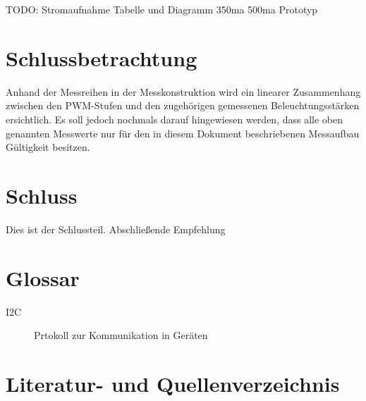 \documentclass[a4paper,12pt]{scrartcl}
\begin{document}

TODO: Stromaufnahme Tabelle und Diagramm 350ma 500ma Prototyp

\clearpage
\section{Schlussbetrachtung}
Anhand der Messreihen in der Messkonstruktion wird ein linearer Zusammenhang zwischen den PWM-Stufen und den zugehörigen gemessenen Beleuchtungsstärken
ersichtlich. Es soll jedoch nochmals darauf hingewiesen werden, dass alle oben genannten Messwerte nur für den in diesem Dokument beschriebenen Messaufbau
Gültigkeit besitzen.


\clearpage
\section{Schluss}
Dies ist der Schlussteil. Abschlie\ss{}ende Empfehlung

\clearpage
\section{Glossar}
\begin{description}
 \item[I2C] Prtokoll zur Kommunikation in Ger\"aten
\end{description}

\clearpage
\section{Literatur- und Quellenverzeichnis}
\end{document}
